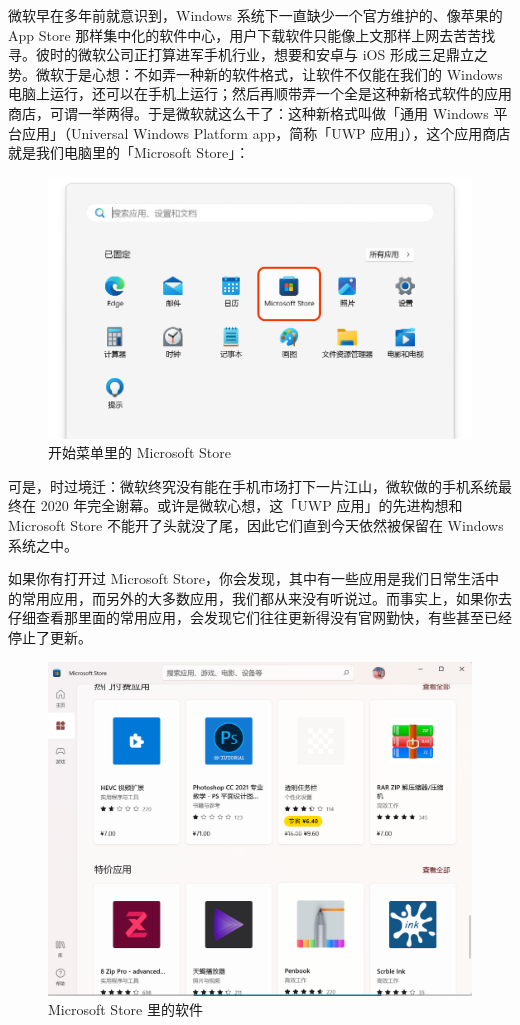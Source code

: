 {{微软早在多年前就意识到，Windows 系统下一直缺少一个官方维护的、像苹果的 App Store 那样集中化的软件中心，用户下载软件只能像上文那样上网去苦苦找寻。彼时的微软公司正打算进军手机行业，想要和安卓与 iOS 形成三足鼎立之势。微软于是心想：不如弄一种新的软件格式，让软件不仅能在我们的 Windows 电脑上运行，还可以在手机上运行；然后再顺带弄一个全是这种新格式软件的应用商店，可谓一举两得。于是微软就这么干了：这种新格式叫做「通用 Windows 平台应用」（Universal Windows Platform app，简称「UWP 应用」），这个应用商店就是我们电脑里的「Microsoft Store」：

\begin{figure}[htb!]
  \centering
  \includegraphics[width=.7\textwidth]{assets/basic/Microsoft_Store.png}
  \caption{开始菜单里的 Microsoft Store}
  \label{fig:Microsoft_Store}
\end{figure}

可是，时过境迁：微软终究没有能在手机市场打下一片江山，微软做的手机系统最终在 2020 年完全谢幕。或许是微软心想，这「UWP 应用」的先进构想和 Microsoft Store 不能开了头就没了尾，因此它们直到今天依然被保留在 Windows 系统之中。

如果你有打开过 Microsoft Store，你会发现，其中有一些应用是我们日常生活中的常用应用，而另外的大多数应用，我们都从来没有听说过。而事实上，如果你去仔细查看那里面的常用应用，会发现它们往往更新得没有官网勤快，有些甚至已经停止了更新。

\begin{figure}[htb!]
  \centering
  \includegraphics[width=.75\textwidth]{assets/basic/Software_in_MS_Store.png}
  \caption{Microsoft Store 里的软件}
  \label{fig:Software_in_MS_Store}
\end{figure}

}}
